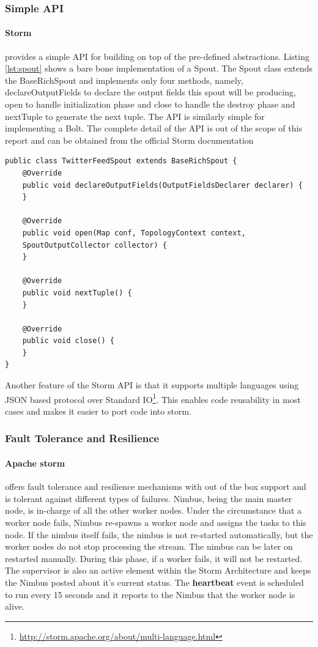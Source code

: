 \documentclass[runningheads,a4paper]{llncs}[2015/06/24]
\begin{document}
\subsubsection{Simple API}
\paragraph{Storm} provides a simple API for building on top of the pre-defined abstractions. Listing \ref{lst:spout} shows a bare bone implementation of a Spout. The Spout class extends the BaseRichSpout and implements only four methods, namely, declareOutputFields to declare the output fields this spout will be producing, open to handle initialization phase and close to handle the destroy phase and nextTuple to generate the next tuple. The API is similarly simple for implementing a Bolt. The complete detail of the API is out of the scope of this report and can be obtained from the official Storm documentation

\begin{lstlisting}[float,caption=Bare Spout Implementation,label=lst:spout]
public class TwitterFeedSpout extends BaseRichSpout {
	@Override
	public void declareOutputFields(OutputFieldsDeclarer declarer) {
	}
	
	@Override
	public void open(Map conf, TopologyContext context, 
	SpoutOutputCollector collector) {
	}

	@Override
	public void nextTuple() {
	}

	@Override
	public void close() {
	}
}
\end{lstlisting}

Another feature of the Storm API is that it supports multiple languages using JSON based protocol over Standard IO\footnote{\url{http://storm.apache.org/about/multi-language.html}}. This enables code reusability in most cases and makes it easier to port code into storm. 

\subsubsection{Fault Tolerance and Resilience}
\label{sec:resilience}
\paragraph{Apache storm} offers fault tolerance and resilience mechanisms with out of the box support and is tolerant against different types of failures. Nimbus, being the main master node, is in-charge of all the other worker nodes. Under the circumstance that a worker node fails, Nimbus re-spawns a worker node and assigns the tasks to this node. If the nimbus itself fails, the nimbus is not re-started automatically, but the worker nodes do not stop processing the stream. The nimbus can be later on restarted manually. During this phase, if a worker fails, it will not be restarted. The supervisor is also an active element within the Storm Architecture and keeps the Nimbus posted about it's current status. The \textbf{heartbeat} event is scheduled to run every 15 seconds and it reports to the Nimbus that the worker node is alive. \cite{stormtwitter}
\end{document}
